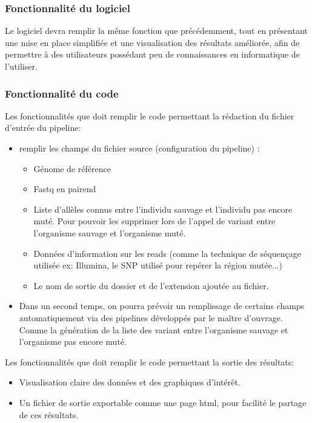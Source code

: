 \documentclass[12pt]{article}
\begin{document}
\subsubsection{Fonctionnalité du logiciel}

Le logiciel devra remplir la même fonction que précédemment, tout en présentant une mise en place simplifiée et une visualisation des résultats améliorée, afin de permettre à des utilisateurs possédant peu de connaissances en informatique de l'utiliser.

\subsubsection{Fonctionnalité du code}

Les fonctionnalités que doit remplir le code permettant la rédaction du fichier d'entrée du pipeline:

\begin{itemize}
\item remplir les champs du fichier source (configuration du pipeline) :
\begin{itemize}
\item Génome de référence
\item Fastq en pairend 
\item Liste d'allèles connus entre l'individu sauvage et l’individu pas encore muté. Pour pouvoir les supprimer lors de l'appel de variant entre l'organisme sauvage et l'organisme muté. 
\item Données d'information sur les reads (comme la technique de séquençage utilisée ex: Illumina, le SNP utilisé pour repérer la région mutée...)
\item Le nom de sortie du dossier et de l’extension ajoutée au fichier.
\end{itemize}
\item Dans un second temps, on pourra prévoir un remplissage de certains champs automatiquement via des pipelines développés par le maître d'ouvrage. Comme la génération de la liste des variant entre l'organisme sauvage et l'organisme pas encore muté.
\end{itemize}

Les fonctionnalités que doit remplir le code permettant la sortie des résultats: 

\begin{itemize}
\item Visualisation claire des données et des graphiques d’intérêt.
\item Un fichier de sortie exportable comme une page html, pour facilité le partage de ces résultats. 
\end{itemize}
\end{document}
